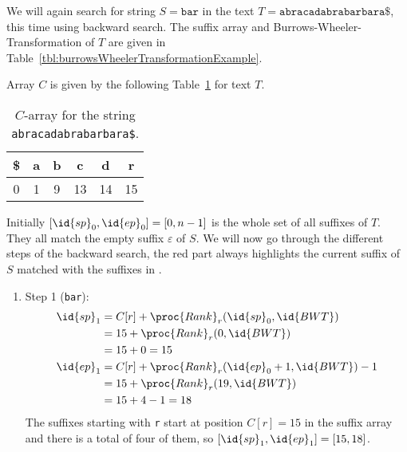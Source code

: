 \begin{Example}
  We will again search for string $S=\texttt{bar}$ in the text $T=\texttt{abracadabrabarbara\$}$, this time using backward search. The suffix array and Burrows-Wheeler-Transformation of $T$ are given in Table~\ref{tbl:burrowsWheelerTransformationExample}.

  Array $C$ is given by the following Table~\ref{tbl:backwardSearchCExample} for text $T$.
  \begin{table}[htb]
    \centering
    \begin{tabular}{cccccc}
      \toprule
      \$ & a & b & c & d & r \\
      \midrule
      0 & 1 & 9 & 13 & 14 & 15 \\
      \bottomrule
    \end{tabular}
    \caption{$C$-array for the string \texttt{abracadabrabarbara\$}.}
    \label{tbl:backwardSearchCExample}
  \end{table}

  Initially $[\id{sp}_0,\id{ep}_0]=[0,n-1]$ is the whole set of all suffixes of $T$. They all match the empty suffix $\varepsilon$ of $S$. We will now go through the different steps of the backward search, the red part always highlights the current suffix of $S$ matched with the suffixes in .
  \begin{enumerate}
    \item Step 1 (\texttt{ba{\color{red}r}}):
    \begin{align*}
      \id{sp}_1 &= C[r] + \proc{Rank}_r(\id{sp}_0, \id{BWT}) \\
                &= 15 + \proc{Rank}_r(0, \id{BWT}) \\
                &= 15 + 0 = 15 \\
      \id{ep}_1 &= C[r] + \proc{Rank}_r(\id{ep}_0 + 1, \id{BWT}) - 1 \\
                &= 15 + \proc{Rank}_r(19, \id{BWT}) \\
                &= 15 + 4 - 1 = 18
    \end{align*}
    The suffixes starting with \texttt{r} start at position $C[r]=15$ in the suffix array and there is a total of four of them, so $[\id{sp}_1,\id{ep}_1]=[15,18]$.


\end{enumerate}
\end{Example}
